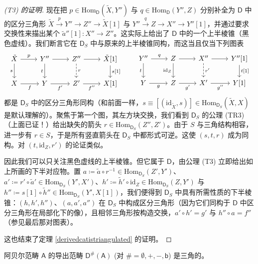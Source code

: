 \begin{proof}[(\textup{T3}) 的证明]
	现在把 $p\in\text{Hom}_\mathsf{D}(\tilde{X},Y'')$ 与 $q\in\text{Hom}_\mathsf{D}(Y'',Z)$ 分别补全为 $\mathsf{D}$ 中的区分三角形 $\tilde{X}\xrightarrow{p} Y''\rightarrow Z''\rightarrow \tilde{X}[1]$ 与 $Y''\xrightarrow{q} Z\rightarrow X''\rightarrow Y''[1]$，并通过要求交换性来描出某个 $\tilde{a}''[1]: X''\rightarrow Z''$。这实际上给出了 $\mathsf{D}$ 中的一个上半棱锥（黑色虚线）。我们断言它在 $\mathsf{D}_S$ 中与原来的上半棱锥同构，而这当且仅当下列图表
	\[
	\begin{tikzcd}
		\tilde{X}\arrow[r, "p"]\arrow[d, "s"'] & Y''\arrow[r]\arrow[d, "t"'] & Z''\arrow[r]\arrow[d, dashed, "r"] & \tilde{X}[1]\arrow[d, "{s[1]}"] \\
		X\arrow[r, "f"'] & Y\arrow[r, "f'"'] & Z'\arrow[r, "f''"'] & X[1]
	\end{tikzcd}\qquad
	\begin{tikzcd}
		Y''\arrow[r, "q"]\arrow[d, "t"'] & Z\arrow[r]\arrow[d, "\text{id}_Z"'] & X''\arrow[r]\arrow[d, dashed, "r'"] & Y''[1]\arrow[d, "{t[1]}"] \\
		Y\arrow[r, "g"'] & Z\arrow[r, "g'"'] & X'\arrow[r, "g''"'] & Y[1]
	\end{tikzcd}
	\]
	都是 $\mathsf{D}_S$ 中的区分三角形同构（和前面一样，$s\equiv[(\text{id}_{\tilde{X}},s)]\in\text{Hom}_{\mathsf{D}_S}(\tilde{X},X)$ 是默认理解的）。聚焦于第一个图，其左方块交换，我们看到 $\mathsf{D}_S$ 的公理 (TR3)（上面已证！）给出缺失的箭头 $r\in\text{Hom}_{\mathsf{D}_S}(Z'',Z')$。由于 $S$ 与三角结构相容，进一步有 $r\in S$，于是所有竖直箭头在 $\mathsf{D}_S$ 中都形式可逆。这使 $(s,t,r)$ 成为同构。对 $(t,\text{id}_Z,r')$ 的论证类似。
	
	因此我们可以只关注黑色虚线的上半棱锥。但它属于 $\mathsf{D}$，由公理 (T3) 立即给出如上所画的下半对应物。置 $a\coloneqq\tilde{a}\circ r^{-1}\in\text{Hom}_{\mathsf{D}_S}(Z',Y')$、$a'\coloneqq r'\circ\tilde{a}'\in\text{Hom}_{\mathsf{D}_S}(Y',X')$、$h'\coloneqq \tilde{h}'\circ\text{id}_Z\in\text{Hom}_{\mathsf{D}_S}(Z,Y')$ 与 $h''\coloneqq s[1]\circ \tilde{h}''\in\text{Hom}_{\mathsf{D}_S}(Y',X[1])$，我们便得到 $\mathsf{D}_S$ 中具有所需性质的下半棱锥：$(h,h',h'')$、$(a,a',a'')$ 在 $\mathsf{D}_S$ 中构成区分三角形（因为它们同构于 $\mathsf{D}$ 中区分三角形在局部化下的像），且相邻三角形按构造交换，$a'\circ h'=g'$ 与 $h''\circ a=f''$（参见最后那对图表）。
	
	这也结束了定理 \ref{derivedcatistriangulated} 的证明。    
\end{proof}

\begin{Cor}\label{D(A)istriangulated}
	阿贝尔范畴 $\mathsf{A}$ 的导出范畴 $\mathsf{D^\#\!(A)}$ \textup(对 $\#=\emptyset,+,-,\mathsf{b}$\textup) 是三角的。
\end{Cor}

